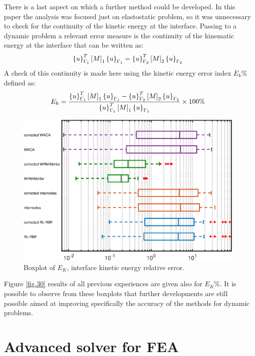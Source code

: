  
 
 \newpage
 
      There is a last aspect on which a further method could be developed. In this paper the analysis was focused just on elastostatic problem, so it was unnecessary to check for the continuity of the kinetic energy at the interface. Passing to a dynamic problem a relevant error measure is the continuity of the kinematic energy at the interface that can be written as:
 \begin{equation}
 \label{eq.90}
 \left\lbrace{u}\right \rbrace_{\Gamma_1}^{T}\left[{M}\right]_1\left\lbrace{u}\right \rbrace_{\Gamma_1}=\left\lbrace{u}\right \rbrace_{\Gamma_2}^{T}\left[{M}\right]_2\left\lbrace{u}\right \rbrace_{\Gamma_2}
 \end{equation}
 A check of this continuity is made here using the kinetic energy error index $E_k \%$ defined as:
 \begin{equation}
 \label{eq.91}
 E_k =\frac{\left\lbrace{u}\right \rbrace_{\Gamma_1}^{T}\left[{M}\right]_1\left\lbrace{u}\right \rbrace_{\Gamma_1}-\left\lbrace{u}\right \rbrace_{\Gamma_2}^{T}\left[{M}\right]_2\left\lbrace{u}\right \rbrace_{\Gamma_2}}{\left\lbrace{u}\right \rbrace_{\Gamma_1}^{T}\left[{M}\right]_1\left\lbrace{u}\right \rbrace_{\Gamma_1}}\times 100 \%
 \end{equation}
 \begin{figure}
 \centering
 \includegraphics[width=0.7\linewidth]{images/Ch1/boxplot_EK}
 \caption{Boxplot of $E_K$, interface kinetic energy relative error.\label{fig.30}}
 \label{fig:boxplot_EK}
 \end{figure}
 
 Figure \ref{fig.30} results of all previous experiences are given also for $E_K \%$. It is possible to observe from these boxplots that further developments are still possible aimed at improving specifically the accuracy of the methods for dynamic problems.
\section{Advanced solver for FEA}
